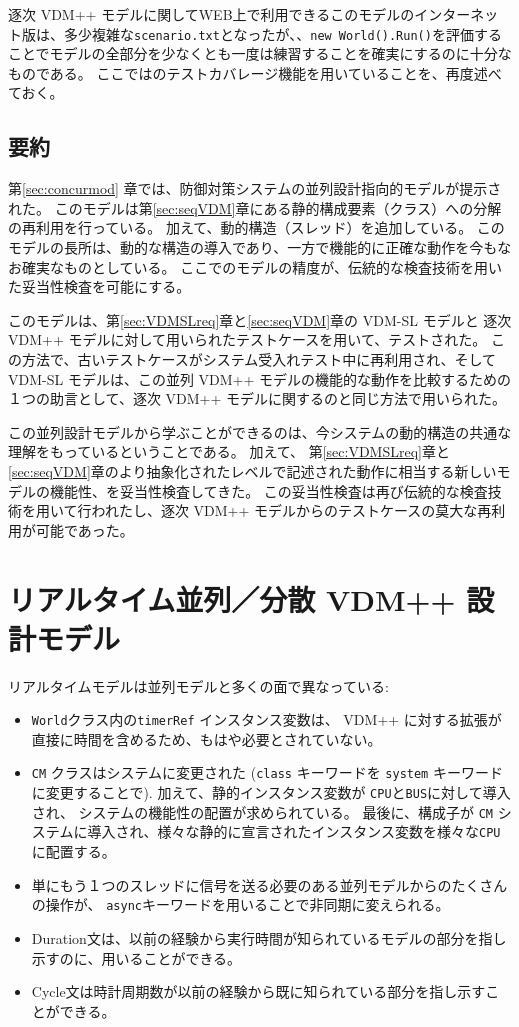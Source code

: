 \documentclass[\pformat,12pt]{jreport}
\begin{document}
逐次 VDM++ モデルに関してWEB上で利用できるこのモデルのインターネット版は、多少複雑な\texttt{scenario.txt}となったが、、\texttt{new World().Run()}を評価することでモデルの全部分を少なくとも一度は練習することを確実にするのに十分なものである。
ここでは\VDMTools のテストカバレージ機能を用いていることを、再度述べておく。

\subsection{要約}

第\ref{sec:concurmod} 章では、防御対策システムの並列設計指向的モデルが提示された。
このモデルは第\ref{sec:seqVDM}章にある静的構成要素（クラス）への分解の再利用を行っている。
加えて、動的構造（スレッド）を追加している。
このモデルの長所は、動的な構造の導入であり、一方で機能的に正確な動作を今もなお確実なものとしている。
ここでのモデルの精度が、伝統的な検査技術を用いた妥当性検査を可能にする。

このモデルは、第\ref{sec:VDMSLreq}章と\ref{sec:seqVDM}章の VDM-SL モデルと 逐次 VDM++ モデルに対して用いられたテストケースを用いて、テストされた。
この方法で、古いテストケースがシステム受入れテスト中に再利用され、そしてVDM-SL モデルは、この並列 VDM++ モデルの機能的な動作を比較するための１つの助言として、逐次 VDM++ モデルに関するのと同じ方法で用いられた。

この並列設計モデルから学ぶことができるのは、今システムの動的構造の共通な理解をもっているということである。
加えて、 第\ref{sec:VDMSLreq}章と\ref{sec:seqVDM}章のより抽象化されたレベルで記述された動作に相当する新しいモデルの機能性、を妥当性検査してきた。
この妥当性検査は再び伝統的な検査技術を用いて行われたし、逐次 VDM++ モデルからのテストケースの莫大な再利用が可能であった。

\section{リアルタイム並列／分散 VDM++ 設計モデル}\label{sec:realtime}

リアルタイムモデルは並列モデルと多くの面で異なっている:

\begin{itemize}
\item  \texttt{World}クラス内の\texttt{timerRef} インスタンス変数は、 VDM++ に対する拡張が直接に時間を含めるため、もはや必要とされていない。
\item  \texttt{CM} クラスはシステムに変更された (\texttt{class} キーワードを \texttt{system} キーワードに変更することで). 
加えて、静的インスタンス変数が \texttt{CPU}と\texttt{BUS}に対して導入され、 システムの機能性の配置が求められている。
最後に、構成子が \texttt{CM} システムに導入され、様々な静的に宣言されたインスタンス変数を様々な\texttt{CPU}に配置する。
\item 単にもう１つのスレッドに信号を送る必要のある並列モデルからのたくさんの操作が、 \texttt{async}キーワードを用いることで非同期に変えられる。
\item Duration文は、以前の経験から実行時間が知られているモデルの部分を指し示すのに、用いることができる。
\item Cycle文は時計周期数が以前の経験から既に知られている部分を指し示すことができる。
\end{itemize}
\end{document}

